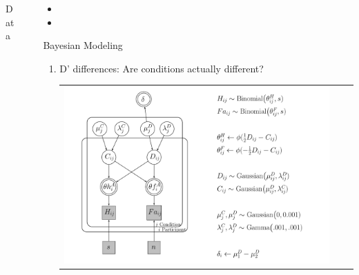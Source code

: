 \documentclass[final]{beamer}
\newlength{\sepwid}
\newlength{\onecolwid}
\newlength{\twocolwid}
\begin{document}
\begin{frame}[t]
\begin{columns}[t]
\begin{column}{\twocolwid}
\begin{columns}[t,totalwidth=\twocolwid]
\begin{column}{\onecolwid}
\begin{alertblock}{Data}
\begin{itemize}
\end{itemize}
\end{alertblock}






\end{column} %

\setlength{\onecolwid}{0.21\paperwidth}
\begin{column}{\sepwid}\end{column} %
\begin{column}{\onecolwid}\vspace{-2.1in} %


\begin{itemize}
\item
\item
\end{itemize}



\begin{alertblock}{Bayesian Modeling}


\begin{enumerate}
\item D' differences: Are conditions actually different?
\begin{center}
\begin{tabular}{ccc}
\includegraphics[width=0.65\linewidth]{Figures/Delta_DiffD_Model4.pdf}
\end{tabular}
\end{center}


\end{enumerate}
\end{alertblock}
\end{column}
\end{columns}
\end{column}
\end{columns}
\end{frame}
\end{document}
